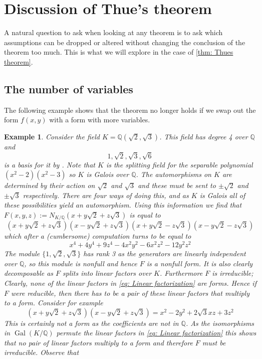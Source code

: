 \documentclass{article}
\DeclareMathOperator{\Gal}{Gal}
\newtheorem{example}{Example}[section]
\newcommand{\mbb}[1]{\mathbb{#1}}
\numberwithin{equation}{section}
\begin{document}
\section{Discussion of Thue's theorem}
A natural question to ask when looking at any theorem is to ask which assumptions can be dropped or altered without changing the conclusion of the theorem too much. This is what we will explore in the case of \cref{thm: Thues theorem}.
\subsection{The number of variables}
The following example shows that the theorem no longer holds if we swap out the form $f(x, y)$ with a form with more variables.

\begin{example}
	Consider the field $K = \mbb Q(\sqrt 2, \sqrt 3)$. This field has degree 4 over $\mbb Q$ and $$1, \sqrt 2, \sqrt 3, \sqrt 6$$ is a basis for it by \citep[p. 526]{dummit}. Note that $K$ is the splitting field for the separable polynomial $(x^2 - 2)(x^2 - 3)$ so $K$ is Galois over $\mbb Q$. The automorphisms on $K$ are determined by their action on $\sqrt 2$ and $\sqrt 3$ and these must be sent to $\pm \sqrt 2$ and $\pm \sqrt 3$ respectively. There are four ways of doing this, and as $K$ is Galois all of these possibilities yield an automorphism. Using this information we find that $F(x,y,z) := N_{K /\mbb Q}(x + y\sqrt 2 + z \sqrt 3)$ is equal to
	\begin{equation}\label{eq: Linear factorization}
    	(x + y\sqrt 2 + z \sqrt 3)(x - y\sqrt 2 + z \sqrt 3)(x + y\sqrt 2 - z \sqrt 3)(x - y\sqrt 2 - z \sqrt 3)
	\end{equation}
	which after a (cumbersome) computation turns to be equal to
	$$x^4 + 4y^4 + 9z^4 - 4x^2y^2 - 6x^2z^2 - 12y^2z^2$$
	The module $\{1, \sqrt 2, \sqrt 3\}$ has rank 3 as the generators are linearly independent over $\mbb Q$, so this module is nonfull and hence $F$ is a nonfull form. It is also clearly decomposable as $F$ splits into linear factors over $K$. Furthermore $F$ is irreducible; Clearly, none of the linear factors in \cref{eq: Linear factorization} are forms. Hence if $F$ were reducible, then there has to be a pair of these linear factors that multiply to a form. Consider for example
	$$(x + y\sqrt 2 + z \sqrt 3)(x - y\sqrt 2 + z \sqrt 3) = x^2 - 2 y^2 + 2 \sqrt 3 x z + 3 z^2$$
	This is certainly not a form as the coefficients are not in $\mbb Q$. As the isomorphisms in $\Gal(K / \mbb Q)$ permute the linear factors in \cref{eq: Linear factorization} this shows that no pair of linear factors multiply to a form and therefore $F$ must be irreducible. Observe that

\end{example}
\end{document}
